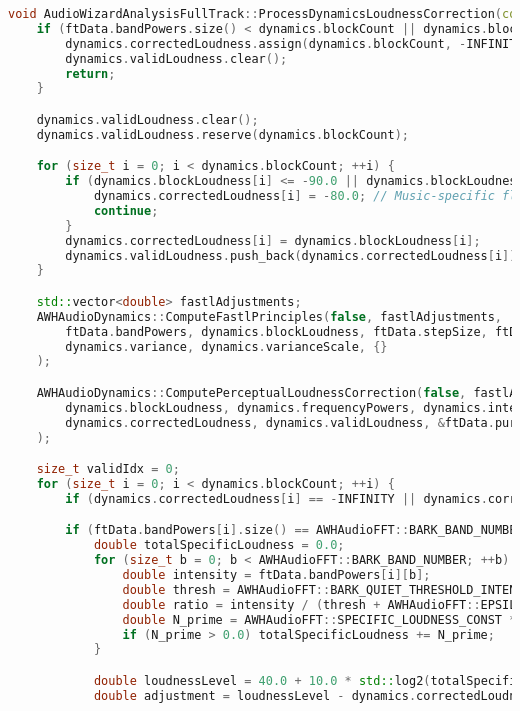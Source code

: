 \documentclass[11pt]{article}
\begin{document}
\begin{lstlisting}[language=C++]
void AudioWizardAnalysisFullTrack::ProcessDynamicsLoudnessCorrection(const FullTrackData& ftData, FullTrackDataDynamics& dynamics) {
	if (ftData.bandPowers.size() < dynamics.blockCount || dynamics.blockLoudness.size() != dynamics.blockCount) {
		dynamics.correctedLoudness.assign(dynamics.blockCount, -INFINITY);
		dynamics.validLoudness.clear();
		return;
	}

	dynamics.validLoudness.clear();
	dynamics.validLoudness.reserve(dynamics.blockCount);

	for (size_t i = 0; i < dynamics.blockCount; ++i) {
		if (dynamics.blockLoudness[i] <= -90.0 || dynamics.blockLoudness[i] == -INFINITY) {
			dynamics.correctedLoudness[i] = -80.0; // Music-specific floor
			continue;
		}
		dynamics.correctedLoudness[i] = dynamics.blockLoudness[i];
		dynamics.validLoudness.push_back(dynamics.correctedLoudness[i]);
	}

	std::vector<double> fastlAdjustments;
	AWHAudioDynamics::ComputeFastlPrinciples(false, fastlAdjustments,
		ftData.bandPowers, dynamics.blockLoudness, ftData.stepSize, ftData.sampleRate,
		dynamics.variance, dynamics.varianceScale, {}
	);

	AWHAudioDynamics::ComputePerceptualLoudnessCorrection(false, fastlAdjustments,
		dynamics.blockLoudness, dynamics.frequencyPowers, dynamics.integratedLUFS, dynamics.variance,
		dynamics.correctedLoudness, dynamics.validLoudness, &ftData.pureDynamicsBlockSums, ftData.stepSize
	);

	size_t validIdx = 0;
	for (size_t i = 0; i < dynamics.blockCount; ++i) {
		if (dynamics.correctedLoudness[i] == -INFINITY || dynamics.correctedLoudness[i] == -100.0) continue;

		if (ftData.bandPowers[i].size() == AWHAudioFFT::BARK_BAND_NUMBER) {
			double totalSpecificLoudness = 0.0;
			for (size_t b = 0; b < AWHAudioFFT::BARK_BAND_NUMBER; ++b) {
				double intensity = ftData.bandPowers[i][b];
				double thresh = AWHAudioFFT::BARK_QUIET_THRESHOLD_INTENSITIES[b] * (1.0 + ftData.maskingFactor[i]);
				double ratio = intensity / (thresh + AWHAudioFFT::EPSILON);
				double N_prime = AWHAudioFFT::SPECIFIC_LOUDNESS_CONST * (std::pow(ratio, 0.23) - 1.0);
				if (N_prime > 0.0) totalSpecificLoudness += N_prime;
			}

			double loudnessLevel = 40.0 + 10.0 * std::log2(totalSpecificLoudness + AWHAudioFFT::EPSILON);
			double adjustment = loudnessLevel - dynamics.correctedLoudness[i];


\end{lstlisting}
\end{document}
